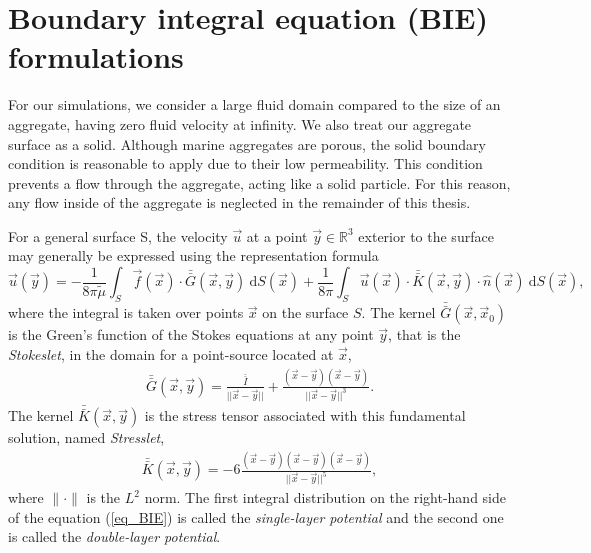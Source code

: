 \section{Boundary integral equation (BIE) formulations} 
For our simulations, we consider a large fluid domain compared to the size of an aggregate, having zero fluid velocity at infinity. We also treat our aggregate surface as a solid. Although marine aggregates are porous, the solid boundary condition is reasonable to apply due to their low permeability. 
This condition prevents a flow through the aggregate, acting like a solid particle. For this reason, any flow inside of the aggregate is neglected in the remainder of this thesis.  
\par
For a general surface S, the velocity $\vec{u}$ at a point $\vec{y}\in \mathbb{R}^3$ exterior to the surface may generally be expressed using the representation formula~\cite{pozrikidis_boundary_1992}
\begin{equation}
   \vec{u}(\vec{y}) =
	- \frac{1}{8 \pi {\tilde{\mu}}} \int_S  \vec{f}(\vec{x}) \cdot \bar{\bar{G}}(\vec{x},\vec{y}) \ \text{d}S(\vec{x}) 
+ \frac{1}{8 \pi} \int_S
\vec{u}(\vec{x}) \cdot  \bar{\bar{K}}(\vec{x},\vec{y})  
\cdot \hat{n} ( \vec{x})
\ \text{d}S(\vec{x}),
\label{eq_BIE}
\end{equation}
where the integral is taken over points $\vec{x}$ on the surface $S$.
The kernel $\bar{\bar{G}}(\vec{x},\vec{x}_0)$ is the Green's function of the Stokes equations at any point $\vec{y}$, that is the {\textit{Stokeslet}}, in the domain for a point-source located at $\vec{x}$,
\begin{align}
  \bar{\bar{G}}(\vec{x},\vec{y}) =   
  \frac{\bar{\bar{I}}}{||\vec{x}-\vec{y}||} + \frac{(\vec{x}-\vec{y})(\vec{x}-\vec{y})}{||\vec{x}-\vec{y}||^3}.
  \label{eq_stokeslet}
  \end{align}
  The kernel  $\bar{\bar{K}}(\vec{x},\vec{y})$ is the stress tensor associated with this fundamental solution, named {\textit{Stresslet}},
  \begin{align}
  \bar{\bar{K}}(\vec{x},\vec{y}) = 
  -6\frac{(\vec{x}-\vec{y})(\vec{x}-\vec{y}) (\vec{x}-\vec{y})}{||\vec{x}-\vec{y}||^5},
  \label{eq_stresslet}
  \end{align}
where $\| \cdot \|$ is the $L^2$ norm. 
The first integral distribution on the right-hand side of the equation (\ref{eq_BIE}) is called the \textit{single-layer potential} and the second one is called the \textit{double-layer potential}. 
